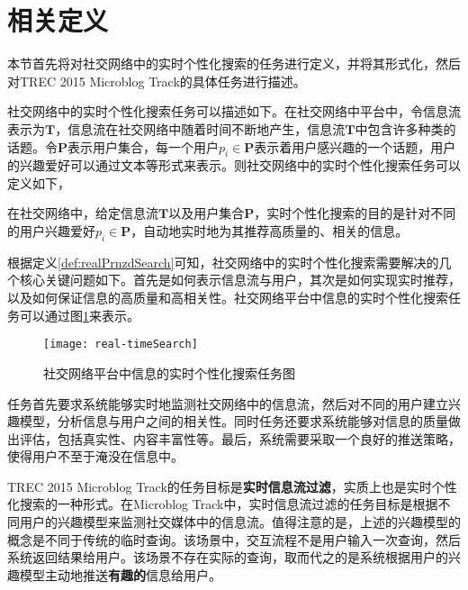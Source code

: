 \section{相关定义}
\label{sec2:definition}
本节首先将对社交网络中的实时个性化搜索的任务进行定义，并将其形式化，然后对TREC 2015 Microblog Track的具体任务进行描述。

社交网络中的实时个性化搜索任务可以描述如下。在社交网络中平台中，令信息流表示为$\mathbf{T}$，信息流在社交网络中随着时间不断地产生，信息流$\mathbf{T}$中包含许多种类的话题。令$\mathbf{P}$表示用户集合，每一个用户$p_i \in \mathbf{P}$表示着用户感兴趣的一个话题，用户的兴趣爱好可以通过文本等形式来表示。则社交网络中的实时个性化搜索任务可以定义如下，
\begin{mydef}[实时个性化搜索]\label{def:realPrnzdSearch}
在社交网络中，给定信息流$\mathbf{T}$以及用户集合$\mathbf{P}$，实时个性化搜索的目的是针对不同的用户兴趣爱好$p_i \in \mathbf{P}$，自动地实时地为其推荐高质量的、相关的信息。
\end{mydef}

根据定义\ref{def:realPrnzdSearch}可知，社交网络中的实时个性化搜索需要解决的几个核心关键问题如下。首先是如何表示信息流与用户，其次是如何实现实时推荐，以及如何保证信息的高质量和高相关性。社交网络平台中信息的实时个性化搜索任务可以通过图\ref{fig:real-timeSearch}来表示。
\begin{figure}[!htbp] %
  \centering
  \texttt{[image: real-timeSearch]}
  \caption{社交网络平台中信息的实时个性化搜索任务图}
  \label{fig:real-timeSearch}
\end{figure}

任务首先要求系统能够实时地监测社交网络中的信息流，然后对不同的用户建立兴趣模型，分析信息与用户之间的相关性。同时任务还要求系统能够对信息的质量做出评估，包括真实性、内容丰富性等。最后，系统需要采取一个良好的推送策略，使得用户不至于淹没在信息中。

TREC 2015 Microblog Track的任务目标是\textbf{实时信息流过滤}，实质上也是实时个性化搜索的一种形式。在Microblog Track中，实时信息流过滤的任务目标是根据不同用户的兴趣模型来监测社交媒体中的信息流。值得注意的是，上述的兴趣模型的概念是不同于传统的临时查询。该场景中，交互流程不是用户输入一次查询，然后系统返回结果给用户。该场景不存在实际的查询，取而代之的是系统根据用户的兴趣模型主动地推送\textbf{有趣的}信息给用户。

